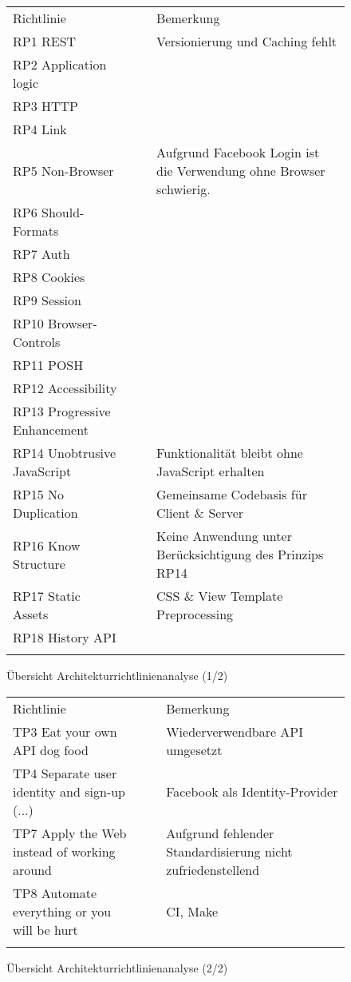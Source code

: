 \begin{figure}[H]
	\begin{table}[H]
		\tablestyle
		\tablealtcolored
		\begin{tabularx}{\textwidth}{l c c X}
			\tableheadcolor
				\tablehead Richtlinie &
				\tablehead\rotatebox{90}{Demonstriert\hspace{3mm}} &
				\tablehead\rotatebox{90}{Resultat} &
				\tablehead Bemerkung
				\tabularnewline
			\tablebody
				RP1	REST & \faOk & \faMeh & Versionierung und Caching fehlt \tabularnewline
				RP2 Application logic & \faOk & \faSmile & \tabularnewline
				RP3 HTTP & \faOk & \faSmile & \tabularnewline
				RP4 Link & \faOk & \faSmile & \tabularnewline
				RP5 Non-Browser & \faOk & \faMeh & Aufgrund Facebook Login ist die Verwendung ohne Browser schwierig. \tabularnewline
				RP6 Should-Formats & \faOk & \faSmile & \tabularnewline
				RP7 Auth & & & \tabularnewline
				RP8 Cookies & & & \tabularnewline
				RP9 Session & & & \tabularnewline
				RP10 Browser-Controls & \faOk & \faSmile & \tabularnewline
				RP11 POSH & & & \tabularnewline
				RP12 Accessibility & & & \tabularnewline
				RP13 Progressive Enhancement & & & \tabularnewline
				RP14 Unobtrusive JavaScript & \faOk & \faSmile & Funktionalität bleibt ohne JavaScript erhalten\tabularnewline
				RP15 No Duplication & \faOk & \faSmile & Gemeinsame Codebasis für Client \& Server\tabularnewline
				RP16 Know Structure & \faExclamation & \faFrown & Keine Anwendung unter Berücksichtigung des Prinzips RP14 \tabularnewline
				RP17 Static Assets & \faOk & \faSmile & CSS \& View Template Preprocessing\tabularnewline
				RP18 History API & \faOk & \faSmile & \tabularnewline
			\tableend
		\end{tabularx}
	\end{table}
	\caption{Übersicht Architekturrichtlinienanalyse (1/2)}
	\label{tab:overview-principle-demonstration}
\end{figure}

\begin{figure}[H]
	\begin{table}[H]
		\tablestyle
		\tablealtcolored
		\begin{tabularx}{\textwidth}{l c c X}
			\tableheadcolor
				\tablehead Richtlinie &
				\tablehead\rotatebox{90}{Demonstriert\hspace{3mm}} &
				\tablehead\rotatebox{90}{Resultat} &
				\tablehead Bemerkung
				\tabularnewline
			\tablebody
				TP3 Eat your own API dog food & \faOk & \faSmile & Wiederverwendbare API umgesetzt\tabularnewline
				TP4 Separate user identity and sign-up (...) & \faOk & \faSmile & Facebook als Identity-Provider\tabularnewline
				TP7 Apply the Web instead of working around & \faOk & \faMeh & Aufgrund fehlender Standardisierung nicht zufriedenstellend\tabularnewline
				TP8 Automate everything or you will be hurt & \faOk & \faSmile & \gls{CI}, Make\tabularnewline
			\tableend
		\end{tabularx}
	\end{table}
	\caption{Übersicht Architekturrichtlinienanalyse (2/2)}
	\label{tab:overview-principle-demonstration-2}
\end{figure}


